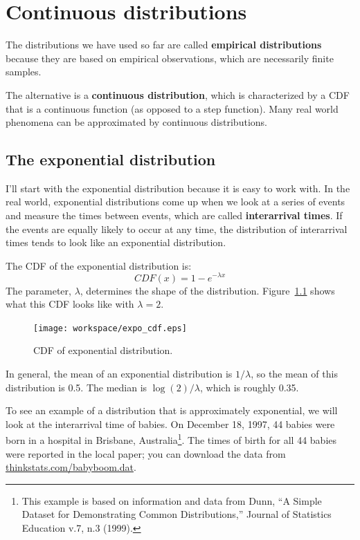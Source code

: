 \documentclass[12pt]{book}
\begin{document}
\chapter{Continuous distributions}
\label{continuous}

The distributions we have used so far are called {\bf
  empirical distributions} because they are based on empirical
observations, which are necessarily finite samples.

The alternative is a {\bf continuous distribution}, which is
characterized by a CDF that is a continuous function (as opposed to a
step function).  Many real world phenomena can be approximated by
continuous distributions.

\section{The exponential distribution}

I'll start with the exponential distribution because it is
easy to work with.  In the real world, exponential distributions
come up when we look at a series of events and measure the
times between events, which are called {\bf interarrival times}.
If the events are equally likely to occur at any time, the distribution
of interarrival times tends to look like an exponential distribution.

The CDF of the exponential distribution is:
%
\[ CDF(x) = 1 - e^{-\lambda x} \]
%
The parameter, $\lambda$, determines the shape of the
distribution.  Figure~\ref{expo_cdf} shows what this CDF looks like with
$\lambda = 2$.

\begin{figure}
\centerline{\texttt{[image: workspace/expo\_cdf.eps]}}
\caption{CDF of exponential distribution.}
\label{expo_cdf}
\end{figure}

In general, the mean of an exponential distribution is $1 / \lambda$,
so the mean of this distribution is 0.5.  The median is $\log(2) / \lambda$,
which is roughly 0.35.

To see an example of a distribution that is approximately exponential,
we will look at the interarrival time of babies.
On December 18, 1997, 44 babies were born in a hospital in Brisbane,
Australia\footnote{This example is based on information and data from
  Dunn, ``A Simple Dataset for Demonstrating Common Distributions,''
  Journal of Statistics Education v.7, n.3 (1999).}.  The times of
birth for all 44 babies were reported in the local paper; you can
download the data from \url{thinkstats.com/babyboom.dat}.
\end{document}
